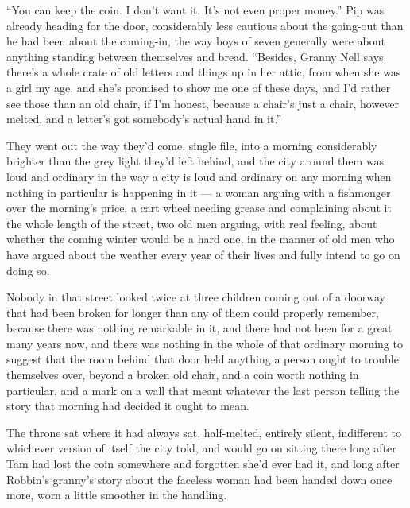 “You can keep the coin. I don’t want it. It’s not even proper money.” Pip was already heading for the door, considerably less cautious about the going-out than he had been about the coming-in, the way boys of seven generally were about anything standing between themselves and bread. “Besides, Granny Nell says there’s a whole crate of old letters and things up in her attic, from when she was a girl my age, and she’s promised to show me one of these days, and I’d rather see those than an old chair, if I’m honest, because a chair’s just a chair, however melted, and a letter’s got somebody’s actual hand in it.”

\sceneBreak

They went out the way they’d come, single file, into a morning considerably brighter than the grey light they’d left behind, and the city around them was loud and ordinary in the way a city is loud and ordinary on any morning when nothing in particular is happening in it — a woman arguing with a fishmonger over the morning’s price, a cart wheel needing grease and complaining about it the whole length of the street, two old men arguing, with real feeling, about whether the coming winter would be a hard one, in the manner of old men who have argued about the weather every year of their lives and fully intend to go on doing so.

Nobody in that street looked twice at three children coming out of a doorway that had been broken for longer than any of them could properly remember, because there was nothing remarkable in it, and there had not been for a great many years now, and there was nothing in the whole of that ordinary morning to suggest that the room behind that door held anything a person ought to trouble themselves over, beyond a broken old chair, and a coin worth nothing in particular, and a mark on a wall that meant whatever the last person telling the story that morning had decided it ought to mean.

The throne sat where it had always sat, half-melted, entirely silent, indifferent to whichever version of itself the city told, and would go on sitting there long after Tam had lost the coin somewhere and forgotten she’d ever had it, and long after Robbin’s granny’s story about the faceless woman had been handed down once more, worn a little smoother in the handling.